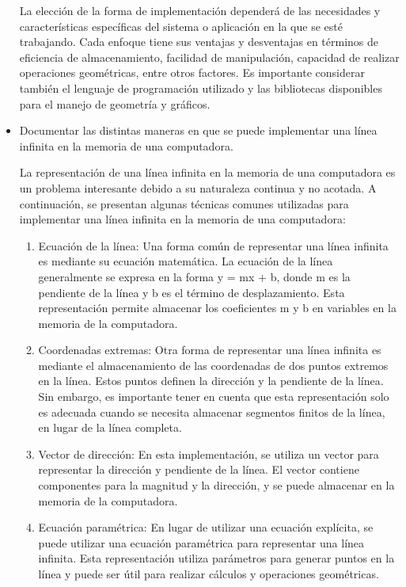 \documentclass{article}
\begin{document}
\begin{itemize}
  La elección de la forma de implementación dependerá de las necesidades y características específicas del sistema o aplicación en la que se esté trabajando. Cada enfoque tiene sus ventajas y desventajas en términos de eficiencia de almacenamiento, facilidad de manipulación, capacidad de realizar operaciones geométricas, entre otros factores. Es importante considerar también el lenguaje de programación utilizado y las bibliotecas disponibles para el manejo de geometría y gráficos.
  
\item Documentar las distintas maneras en que se puede implementar una línea infinita en la memoria de una computadora.

  La representación de una línea infinita en la memoria de una computadora es un problema interesante debido a su naturaleza continua y no acotada. A continuación, se presentan algunas técnicas comunes utilizadas para implementar una línea infinita en la memoria de una computadora:

  \begin{enumerate}
  \item Ecuación de la línea: Una forma común de representar una línea infinita es mediante su ecuación matemática. La ecuación de la línea generalmente se expresa en la forma y = mx + b, donde m es la pendiente de la línea y b es el término de desplazamiento. Esta representación permite almacenar los coeficientes m y b en variables en la memoria de la computadora.
    
  \item Coordenadas extremas: Otra forma de representar una línea infinita es mediante el almacenamiento de las coordenadas de dos puntos extremos en la línea. Estos puntos definen la dirección y la pendiente de la línea. Sin embargo, es importante tener en cuenta que esta representación solo es adecuada cuando se necesita almacenar segmentos finitos de la línea, en lugar de la línea completa.

  \item Vector de dirección: En esta implementación, se utiliza un vector para representar la dirección y pendiente de la línea. El vector contiene componentes para la magnitud y la dirección, y se puede almacenar en la memoria de la computadora.

  \item Ecuación paramétrica: En lugar de utilizar una ecuación explícita, se puede utilizar una ecuación paramétrica para representar una línea infinita. Esta representación utiliza parámetros para generar puntos en la línea y puede ser útil para realizar cálculos y operaciones geométricas.


\end{enumerate}
\end{itemize}
\end{document}

